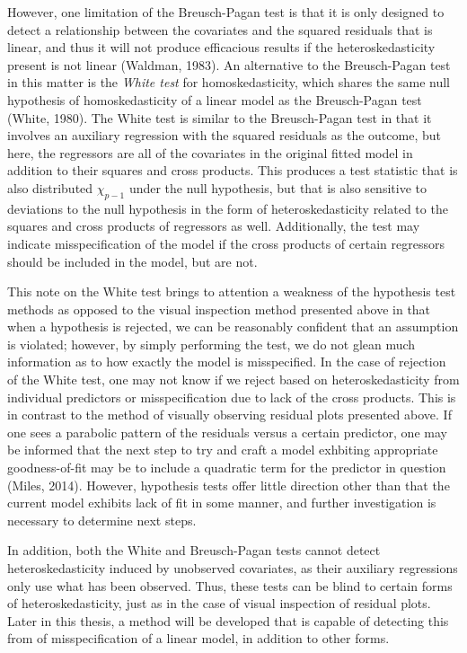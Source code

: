		However, one limitation of the Breusch-Pagan test is that it is only designed to detect a relationship between the covariates and the squared residuals that is linear, and thus it will not
		produce efficacious results if the heteroskedasticity present is not linear (Waldman, 1983). An alternative to the Breusch-Pagan test in this matter is the \textit{White test} for homoskedasticity,
		which shares the same null hypothesis of homoskedasticity of a linear model as the Breusch-Pagan test (White, 1980). The White test is similar to the Breusch-Pagan test in that it involves
		an auxiliary regression with the squared residuals as the outcome, but here, the regressors are all of the covariates in the original fitted model in addition to their squares and cross
		products. This produces a test statistic that is also distributed $\chi_{p-1}$ under the null hypothesis, but that is also sensitive to deviations to the null hypothesis in the form of
		heteroskedasticity related to the squares and cross products of regressors as well. Additionally, the test may indicate misspecification of the model if the cross products of certain
		regressors should be included in the model, but are not.

		This note on the White test brings to attention a weakness of the hypothesis test methods as opposed to the visual inspection method presented above in that when a hypothesis is rejected,
		we can be reasonably confident that an assumption is violated; however, by simply performing the test, we do not glean much information as to how exactly the model is misspecified. In the
		case of rejection of the White test, one may not know if we reject based on heteroskedasticity from individual predictors or misspecification due to lack of the cross products. This is in 
		contrast to the method of visually observing residual plots presented above. If one sees a parabolic pattern of the residuals versus a certain predictor, one may be informed that the next 
		step to try and craft a model exhbiting appropriate goodness-of-fit may be to include a quadratic term for the predictor in question (Miles, 2014). However, hypothesis tests offer little
		direction other than that the current model exhibits lack of fit in some manner, and further investigation is necessary to determine next steps.

		In addition, both the White and Breusch-Pagan tests cannot detect heteroskedasticity induced by unobserved covariates, as their auxiliary regressions only use what has been observed.
		Thus, these tests can be blind to certain forms of heteroskedasticity, just as in the case of visual inspection of residual plots. Later in this thesis, a method will be developed
		that is capable of detecting this from of misspecification of a linear model, in addition to other forms.

